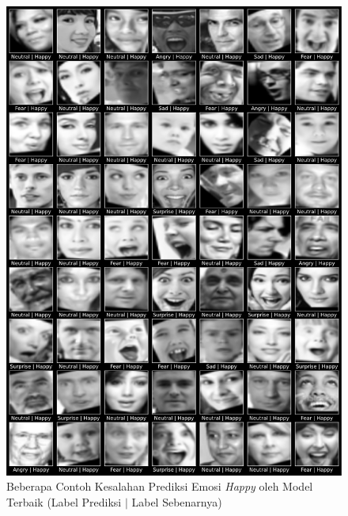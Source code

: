 \begin{figure}[t]
    \centering
    \includegraphics[width=14cm]{gambar/contoh_hasil_prediksi_false_happy.png}
    \caption{Beberapa Contoh Kesalahan Prediksi Emosi \textit{Happy} oleh Model Terbaik (Label Prediksi $|$ Label Sebenarnya)}
    \label{fig:hasilprediksifalse3}
\end{figure}

